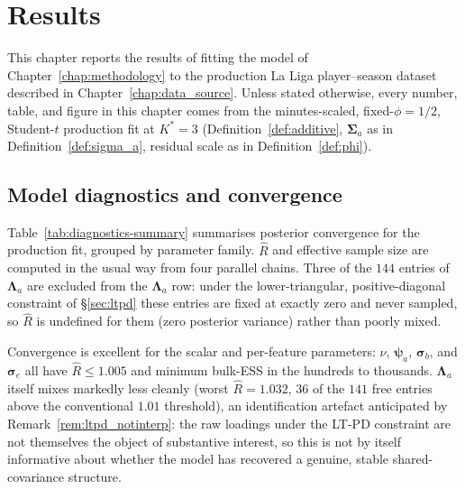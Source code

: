\chapter{Results} \label{chap:results}

This chapter reports the results of fitting the model of Chapter~\ref{chap:methodology} to the production
La Liga player--season dataset described in Chapter~\ref{chap:data_source}. Unless stated otherwise, every
number, table, and figure in this chapter comes from the minutes-scaled, fixed-$\phi=1/2$, Student-$t$
production fit at $K^*=3$ (Definition~\ref{def:additive}, $\boldsymbol\Sigma_a$ as in
Definition~\ref{def:sigma_a}, residual scale as in Definition~\ref{def:phi}).

\section{Model diagnostics and convergence}
\label{sec:results-diagnostics}

Table~\ref{tab:diagnostics-summary} summarises posterior convergence for the production fit, grouped by
parameter family. $\hat R$ and effective sample size are computed in the usual way from four parallel chains.
Three of the $144$ entries of $\boldsymbol\Lambda_a$ are excluded from the $\boldsymbol\Lambda_a$ row: under the
lower-triangular, positive-diagonal constraint of \S\ref{sec:ltpd} these entries are fixed at exactly zero and
never sampled, so $\hat R$ is undefined for them (zero posterior variance) rather than poorly mixed.

\begin{table}[tbp]
\centering
\caption{Posterior convergence summary for the production fit, by parameter family. $\nu$ is the
Student-$t$ degrees of freedom (Definition~\ref{def:student_t}); $\boldsymbol\Lambda_a$, $\boldsymbol\Psi_a$
are the factor loadings and uniqueness (Definition~\ref{def:sigma_a}); $\boldsymbol\sigma_b,\boldsymbol\sigma_e$
are the season and residual scales. The $\boldsymbol\Lambda_a\boldsymbol\Lambda_a^\top$ row summarises all
$P(P+1)/2$ unique entries of the rotation-invariant common-variance matrix (Definition~\ref{def:pca_postproc});
the $d_1,d_2,d_3$ row summarises its three eigenvalues, the quantities Criterion A and
Table~\ref{tab:pca-variance-shares} actually depend on.}
\label{tab:diagnostics-summary}
\small

\end{table}

Convergence is excellent for the scalar and per-feature parameters: $\nu$, $\boldsymbol\psi_a$,
$\boldsymbol\sigma_b$, and $\boldsymbol\sigma_e$ all have $\hat R \leq 1.005$ and minimum bulk-ESS in the
hundreds to thousands. $\boldsymbol\Lambda_a$ itself mixes markedly less cleanly (worst $\hat R = 1.032$,
$36$ of the $141$ free entries above the conventional $1.01$ threshold), an identification artefact
anticipated by Remark~\ref{rem:ltpd_notinterp}: the raw loadings under the LT-PD constraint are not
themselves the object of substantive interest, so this is not by itself informative about whether the model
has recovered a genuine, stable shared-covariance structure.


